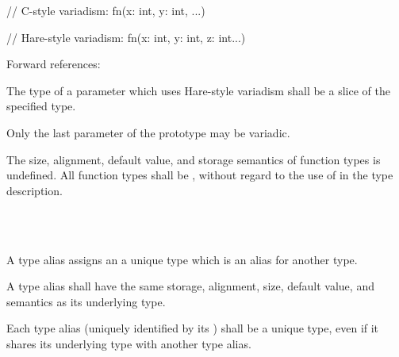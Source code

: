 \begin{codesample}
// C-style variadism:
fn(x: int, y: int, ...)

// Hare-style variadism:
fn(x: int, y: int, z: int...)
\end{codesample}

Forward references: 

\specsubsubitem
The type of a parameter which uses Hare-style variadism shall be a
 slice of the specified type.


\specsubsubitem
Only the last parameter of the prototype may be variadic.

\specsubsubitem
The size, alignment, default value, and storage semantics of function types is
undefined. All function types shall be , without regard to the
use of  in the type description.


\begin{grammar}
 \\
	 \\
\end{grammar}

\specsubsubitem
A type alias assigns an  a unique type which is an
alias for another type.


\specsubsubitem
A type alias shall have the same storage, alignment, size, default value, and
semantics as its underlying type.

\specsubsubitem
Each type alias (uniquely identified by its ) shall be
a unique type, even if it shares its underlying type with another type alias.

